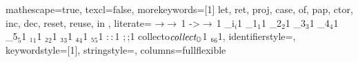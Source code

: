 \acmDOI{} %







\usepackage{mathpartir} %
\usepackage{listings}

 {
mathescape=true,
texcl=false,
morekeywords=[1] {
let, ret, proj, case, of, pap, ctor, inc, dec, reset, reuse, in
},
literate=
{→}{{\ensuremath{\rightarrow\,}}}1
{->}{{\ensuremath{\rightarrow\,}}}1
{_i}{{\ensuremath{_i}}}1
{_1}{{\ensuremath{_1}}}1
{_2}{{\ensuremath{_2}}}1
{_3}{{\ensuremath{_3}}}1
{_4}{{\ensuremath{_4}}}1
{_5}{{\ensuremath{_5}}}1
{₁}{{\ensuremath{_1}}}1
{₂}{{\ensuremath{_2}}}1
{₃}{{\ensuremath{_3}}}1
{₄}{{\ensuremath{_4}}}1
{₅}{{\ensuremath{_5}}}1
{:}{{\ensuremath{\,}}:{\ensuremath{\,}}}1
{;}{{\ensuremath{\,}};}1
{collecto}{{\ensuremath{\textit{collect}_\own{}}}}1
{₆}{{\ensuremath{_6}}}1,
identifierstyle={\rmfamily\itshape\color{black}},
keywordstyle=[1]{\ttfamily\bfseries\color{black}},
stringstyle=\ttfamily,
columns=fullflexible
}

\lstset{language=IR}
\usepackage{amsthm} %
\usepackage{amssymb} %
\usepackage[capitalise]{cleveref} %
\usepackage{hyperref} %

